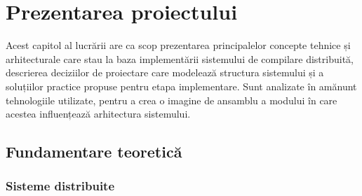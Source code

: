 \chapter{Prezentarea proiectului}

Acest capitol al lucrării are ca scop prezentarea principalelor concepte tehnice și
arhitecturale care stau la baza implementării sistemului de compilare distribuită,
descrierea deciziilor de proiectare care modelează structura sistemului și a soluțiilor
practice propuse pentru etapa implementare. Sunt analizate în amănunt tehnologiile utilizate,
pentru a crea o imagine de ansamblu a modului în care acestea influențează arhitectura sistemului.

\section{Fundamentare teoretică}

\subsection{Sisteme distribuite}




